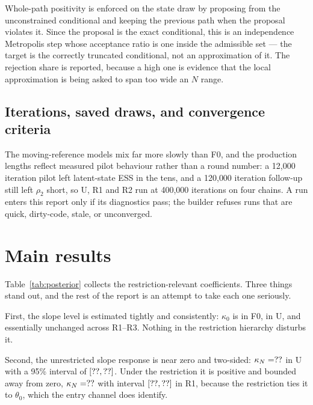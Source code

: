 \documentclass[11pt]{article}
\begin{document}
Whole-path positivity is enforced on the state draw by proposing from the
unconstrained conditional and keeping the previous path when the proposal
violates it. Since the proposal is the exact conditional, this is an
independence Metropolis step whose acceptance ratio is one inside the admissible
set --- the target is the correctly truncated conditional, not an approximation
of it. The rejection share is reported, because a high one is evidence that the
local approximation is being asked to span too wide an $N$ range.

\subsection{Iterations, saved draws, and convergence criteria}
The moving-reference models mix far more slowly than F0, and the production
lengths reflect measured pilot behaviour rather than a round number: a 12{,}000
iteration pilot left latent-state ESS in the tens, and a 120{,}000 iteration
follow-up still left $\rho_2$ short, so U, R1 and R2 run at 400{,}000 iterations
on four chains. A run enters this report only if its diagnostics pass; the
builder refuses runs that are quick, dirty-code, stale, or unconverged.

\par\medskip


\section{Main results}
Table~\ref{tab:posterior} collects the restriction-relevant coefficients. Three
things stand out, and the rest of the report is an attempt to take each one
seriously.

First, the slope level is estimated tightly and consistently: $\kappa_0$ is
\TheoryFZeroKappaZero{} in F0, \TheoryUKappaZero{} in U, and essentially
unchanged across R1--R3. Nothing in the restriction hierarchy disturbs it.

Second, the unrestricted slope response is near zero and two-sided:
$\kappa_N=??$ in U with a 95\% interval of
$[??,??]$. Under the restriction it is positive and
bounded away from zero, $\kappa_N=??$ with interval
$[??,??]$ in R1, because the restriction ties
it to $\theta_0$, which the entry channel does identify.
\end{document}
